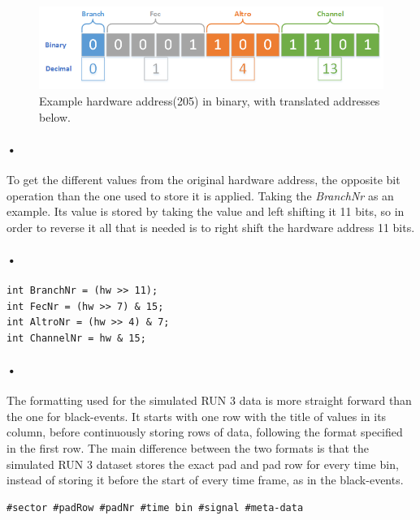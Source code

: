 \documentclass[a4paper, 12pt]{report}
\begin{document}
\begin{figure}[h!]
	\centering
		\includegraphics[width=1.0\textwidth]{images/hw-binary.png}
		\caption{Example hardware address(205) in binary, with translated addresses below.}
		\label{fig:hw-binary}
\end{figure}

\paragraph{•}
To get the different values from the original hardware address, the opposite bit operation than the one used to store it is applied.
Taking the \textit{BranchNr} as an example.
Its value is stored by taking the value and left shifting it 11 bits, so in order to reverse it all that is needed is to right shift the hardware address 11 bits.
\paragraph{•}
\begin{minipage}{\linewidth}
\begin{lstlisting}[caption=Bitwise operation to retrieve values from the hardware address., label=lst:bit-operation]
int BranchNr = (hw >> 11);
int FecNr = (hw >> 7) & 15;
int AltroNr = (hw >> 4) & 7;
int ChannelNr = hw & 15;
\end{lstlisting}
\end{minipage}

\paragraph{•}
The formatting used for the simulated RUN 3 data is more straight forward than the one for black-events.
It starts with one row with the title of values in its column, before continuously storing rows of data, following the format specified in the first row.
The main difference between the two formats is that the simulated RUN 3 dataset stores the exact pad and pad row for every time bin, instead of storing it before the start of every time frame, as in the black-events.

\begin{lstlisting}[caption=Format for the simulated RUN 3 dataset., label=lst:synthetic-data-format]
#sector #padRow #padNr #time bin #signal #meta-data
\end{lstlisting}
\end{document}
